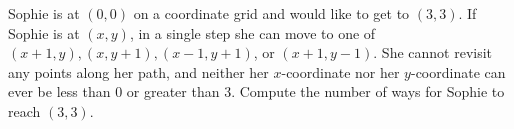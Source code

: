Sophie is at $(0,0)$ on a coordinate grid and would like to get to $(3,3)$. If Sophie is at $(x, y)$, in a single step she can move to one of $(x+1, y),(x, y+1),(x-1, y+1)$, or $(x+1, y-1)$. She cannot revisit any points along her path, and neither her $x$-coordinate nor her $y$-coordinate can ever be less than $0$ or greater than 3. Compute the number of ways for Sophie to reach $(3,3)$.